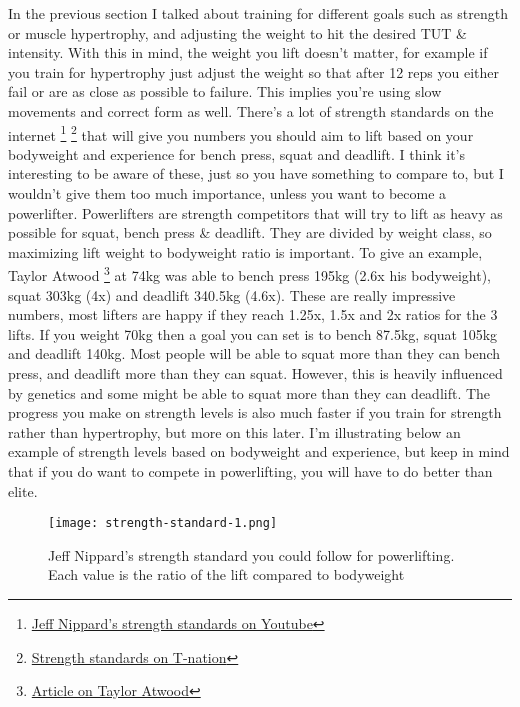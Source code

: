 \documentclass[openany, 12pt]{book}
\begin{document}
        In the previous section I talked about training for different goals such as strength or muscle hypertrophy, and adjusting the weight to hit the desired TUT \& intensity.
        With this in mind, the weight you lift doesn't matter, for example if you train for hypertrophy just adjust the weight so that after 12 reps you either fail or are as close
        as possible to failure. This implies you're using slow movements and correct form as well. There's a lot of strength standards on the internet
        \footnote{\href{https://www.youtube.com/watch?v=LrDJXIQ_-eg}{Jeff Nippard's strength standards on Youtube}}
        \footnote{\href{https://www.t-nation.com/training/strength-standards-are-you-strong/}{Strength standards on T-nation}} that will give you numbers you should aim to lift based
        on your bodyweight and experience for bench press, squat and deadlift. I think it's interesting to be aware of these, just so you have something to compare to, but I wouldn't give
        them too much importance, unless you want to become a powerlifter. Powerlifters are strength competitors that will try to lift as heavy as possible for squat, bench press \& deadlift.
        They are divided by weight class, so maximizing lift weight to bodyweight ratio is important. To give an example, Taylor Atwood
        \footnote{\href{https://barbend.com/taylor-atwood-3-american-records-2021-usapl-nationals/}{Article on Taylor Atwood}}
        at 74kg was able to bench press 195kg (2.6x his bodyweight), squat 303kg (4x) and deadlift 340.5kg (4.6x). These are really impressive numbers, most lifters are happy
        if they reach 1.25x, 1.5x and 2x ratios for the 3 lifts. If you weight 70kg then a goal you can set is to bench 87.5kg, squat 105kg and deadlift 140kg.
        Most people will be able to squat more than they can bench press, and deadlift more than they can squat. However, this is heavily influenced by genetics and some might be able to
        squat more than they can deadlift. The progress you make on strength levels is also much faster if you train for strength rather than hypertrophy, but more on this later. I'm
        illustrating below an example of strength levels based on bodyweight and experience, but keep in mind that if you do want to compete in powerlifting, you will have to do better
        than elite.

        \begin{figure}[h]
		\centering
		\texttt{[image: strength-standard-1.png]}
		\caption{Jeff Nippard’s strength standard you could follow for powerlifting. Each value is the ratio of the lift compared to bodyweight}
		\label{fig13}
	\end{figure}
        
\end{document}
